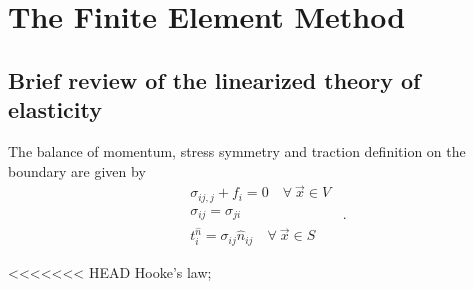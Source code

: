 \chapter{The Finite Element Method}

\section{Brief review of the linearized theory of elasticity}
The balance of momentum, stress symmetry and traction definition on the boundary are given by
\begin{equation} \label{eq:pde}
\begin{split}
&{\sigma _{ij,j}} + {f_i} = 0 \quad \forall\ \vec{x} \in V\\
 &\sigma _{ij}=\sigma _{ji}\\
& t_i^{\hat n} = {\sigma _{ij}}{\hat n_{ij}} \quad \forall\ \vec{x} \in S
\end{split} \enspace .
\end{equation}

<<<<<<< HEAD
Hooke's law;

